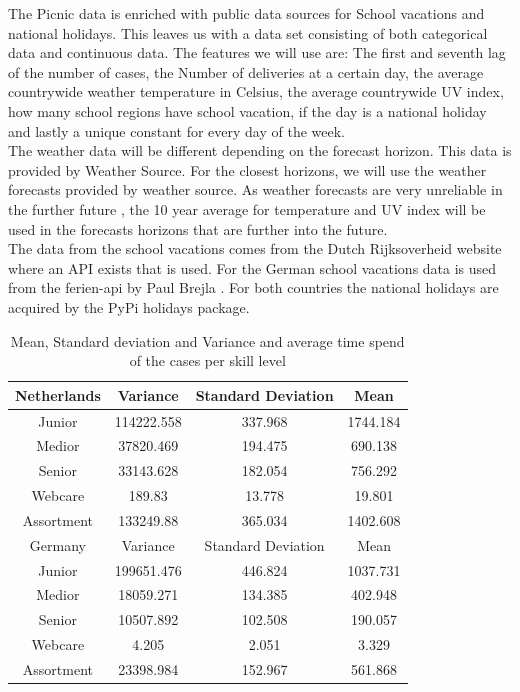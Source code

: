 The Picnic data is enriched with public data sources for School vacations and national holidays. This leaves us with a data set consisting of both categorical data and continuous data. The features we will use are: The first and seventh lag of the number of cases, the Number of deliveries at a certain day, the average countrywide weather temperature in Celsius, the average countrywide UV index, how many school regions have school vacation, if the day is a national holiday and lastly a unique constant for every day of the week.\\

The weather data will be different depending on the forecast horizon. This data is provided by Weather Source. For the closest horizons, we will use the weather forecasts provided by weather source. As weather forecasts are very unreliable in the further future \citep{Scher2018PredictingLearning}, the 10 year average for temperature and UV index will be used in the forecasts horizons that are further into the future.\\

The data from the school vacations comes from the Dutch Rijksoverheid website where an API exists that is used. For the German school vacations data is used from the ferien-api by Paul Brejla \citep{BrejlaDeutscheFerientermine}. For both countries the national holidays are acquired by the PyPi holidays package.\\

\begin{table}[]
    \centering
    \begin{tabular}{|c|c c c|}\hline
        Netherlands & Variance & Standard Deviation & Mean\\
        \hline
        Junior & 114222.558 & 337.968 & 1744.184\\
        Medior & 37820.469 & 194.475 & 690.138\\
        Senior & 33143.628 & 182.054 & 756.292\\
        Webcare & 189.83 & 13.778 & 19.801\\
        Assortment & 133249.88 & 365.034 & 1402.608\\
        \hline
        Germany & Variance & Standard Deviation & Mean\\
        \hline
        Junior & 199651.476 & 446.824 & 1037.731\\
        Medior & 18059.271 & 134.385 & 402.948\\
        Senior & 10507.892 & 102.508 & 190.057\\
        Webcare & 4.205 & 2.051 & 3.329\\
        Assortment & 23398.984 & 152.967 & 561.868\\\hline
    \end{tabular}
    \caption{Mean, Standard deviation and Variance and average time spend of the cases per skill level}
    \label{tab:mean_var}
\end{table}

